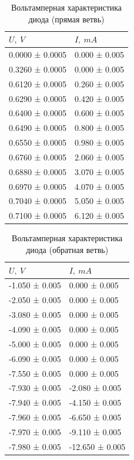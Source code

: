 \documentclass[12pt]{article}
\begin{document}
	
\begin{minipage}{0.4\textwidth}
	\begin{table}[H]
		\begin{tabular}{ll}
			\toprule
			$U,\: V$ &          $I,\: mA$ \\
			\midrule
			0.0000 ± 0.0005 &  0.000 ± 0.005 \\
			0.3260 ± 0.0005 &  0.000 ± 0.005 \\
			0.6120 ± 0.0005 &  0.260 ± 0.005 \\
			0.6290 ± 0.0005 &  0.420 ± 0.005 \\
			0.6400 ± 0.0005 &  0.600 ± 0.005 \\
			0.6490 ± 0.0005 &  0.800 ± 0.005 \\
			0.6550 ± 0.0005 &  0.980 ± 0.005 \\
			0.6760 ± 0.0005 &  2.060 ± 0.005 \\
			0.6880 ± 0.0005 &  3.070 ± 0.005 \\
			0.6970 ± 0.0005 &  4.070 ± 0.005 \\
			0.7040 ± 0.0005 &  5.050 ± 0.005 \\
			0.7100 ± 0.0005 &  6.120 ± 0.005 \\
			\bottomrule
		\end{tabular}
	\caption{Вольтамперная характеристика диода (прямая ветвь) }
	\end{table}
\end{minipage}
\hfill
\begin{minipage}{0.4\textwidth}
	\begin{table}[H]
		\begin{tabular}{ll}
			\toprule
			$U,\: V$ &          $I,\: mA$ \\
			\midrule
			-1.050 ± 0.005 &    0.000 ± 0.005 \\
			-2.050 ± 0.005 &    0.000 ± 0.005 \\
			-3.080 ± 0.005 &    0.000 ± 0.005 \\
			-4.090 ± 0.005 &    0.000 ± 0.005 \\
			-5.000 ± 0.005 &    0.000 ± 0.005 \\
			-6.090 ± 0.005 &    0.000 ± 0.005 \\
			-7.550 ± 0.005 &    0.000 ± 0.005 \\
			-7.930 ± 0.005 &   -2.080 ± 0.005 \\
			-7.940 ± 0.005 &   -4.150 ± 0.005 \\
			-7.960 ± 0.005 &   -6.650 ± 0.005 \\
			-7.970 ± 0.005 &   -9.110 ± 0.005 \\
			-7.980 ± 0.005 &  -12.650 ± 0.005 \\
			\bottomrule
		\end{tabular}
	\caption{Вольтамперная характеристика диода (обратная ветвь)}
	\end{table}
	
\end{minipage}
\end{document}
